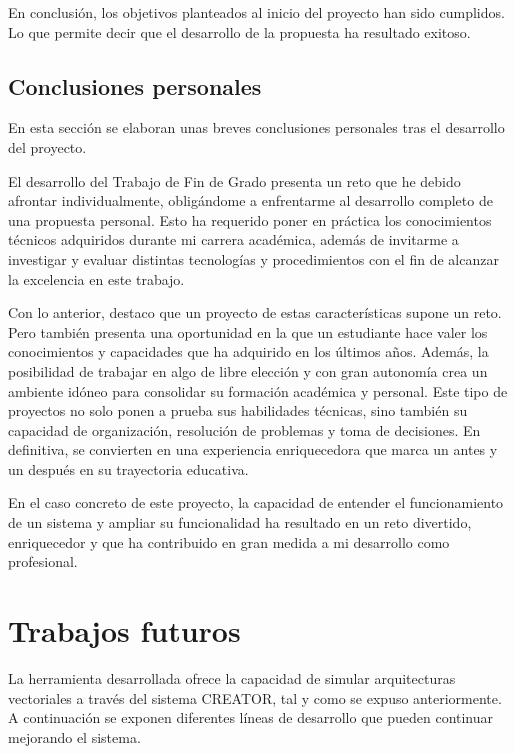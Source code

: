 En conclusión, los objetivos planteados al inicio del proyecto han sido cumplidos. Lo que permite decir que el desarrollo de la propuesta ha resultado exitoso.

\subsection{Conclusiones personales}

En esta sección se elaboran unas breves conclusiones personales tras el desarrollo del proyecto.

El desarrollo del Trabajo de Fin de Grado presenta un reto que he debido afrontar individualmente, obligándome a enfrentarme al desarrollo completo de una propuesta personal. Esto ha requerido poner en práctica los conocimientos técnicos adquiridos durante mi carrera académica, además de invitarme a investigar y evaluar distintas tecnologías y procedimientos con el fin de alcanzar la excelencia en este trabajo.

Con lo anterior, destaco que un proyecto de estas características supone un reto. Pero también presenta una oportunidad en la que un estudiante hace valer los conocimientos y capacidades que ha adquirido en los últimos años. Además, la posibilidad de trabajar en algo de libre elección y con gran autonomía crea un ambiente idóneo para consolidar su formación académica y personal. Este tipo de proyectos no solo ponen a prueba sus habilidades técnicas, sino también su capacidad de organización, resolución de problemas y toma de decisiones. En definitiva, se convierten en una experiencia enriquecedora que marca un antes y un después en su trayectoria educativa.

En el caso concreto de este proyecto, la capacidad de entender el funcionamiento de un sistema y ampliar su funcionalidad ha resultado en un reto divertido, enriquecedor y que ha contribuido en gran medida a mi desarrollo como profesional.

\section{Trabajos futuros}\label{sec:future-work}

La herramienta desarrollada ofrece la capacidad de simular arquitecturas vectoriales a través del sistema CREATOR, tal y como se expuso anteriormente. A continuación se exponen diferentes líneas de desarrollo que pueden continuar mejorando el sistema.

